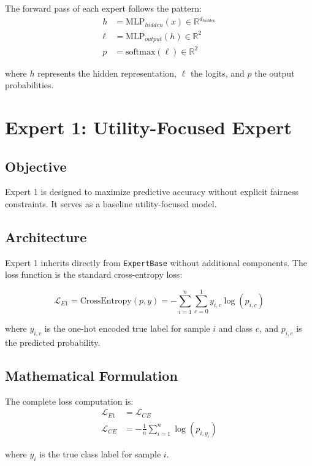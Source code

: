 \documentclass[11pt]{article}
\begin{document}
The forward pass of each expert follows the pattern:
\begin{align}
    h &= \text{MLP}_{hidden}(x) \in \mathbb{R}^{d_{hidden}} \\
    \ell &= \text{MLP}_{output}(h) \in \mathbb{R}^{2} \\
    p &= \text{softmax}(\ell) \in \mathbb{R}^{2}
\end{align}

where $h$ represents the hidden representation, $\ell$ the logits, and $p$ the output probabilities.

\section{Expert 1: Utility-Focused Expert}

\subsection{Objective}
Expert 1 is designed to maximize predictive accuracy without explicit fairness constraints. It serves as a baseline utility-focused model.

\subsection{Architecture}
Expert 1 inherits directly from \texttt{ExpertBase} without additional components. The loss function is the standard cross-entropy loss:

\begin{equation}
    \mathcal{L}_{E1} = \text{CrossEntropy}(p, y) = -\sum_{i=1}^{n} \sum_{c=0}^{1} y_{i,c} \log(p_{i,c})
\end{equation}

where $y_{i,c}$ is the one-hot encoded true label for sample $i$ and class $c$, and $p_{i,c}$ is the predicted probability.

\subsection{Mathematical Formulation}
The complete loss computation is:
\begin{align}
    \mathcal{L}_{E1} &= \mathcal{L}_{CE} \\
    \mathcal{L}_{CE} &= -\frac{1}{n} \sum_{i=1}^{n} \log(p_{i,y_i})
\end{align}

where $y_i$ is the true class label for sample $i$.
\end{document}
